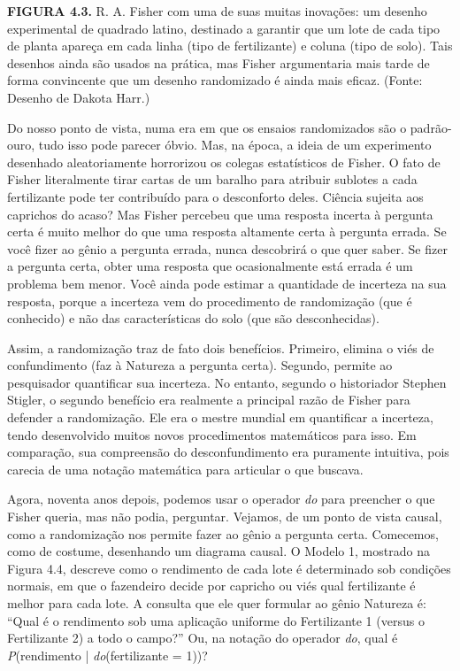 \documentclass[11pt,a5paper,twoside]{book}
\begin{document}
\textbf{FIGURA 4.3.} R. A. Fisher com uma de suas muitas inovações: um desenho experimental de quadrado latino, destinado a garantir que um lote de cada tipo de planta apareça em cada linha (tipo de fertilizante) e coluna (tipo de solo). Tais desenhos ainda são usados na prática, mas Fisher argumentaria mais tarde de forma convincente que um desenho randomizado é ainda mais eficaz. (Fonte: Desenho de Dakota Harr.)

Do nosso ponto de vista, numa era em que os ensaios randomizados são o padrão-ouro, tudo isso pode parecer óbvio. Mas, na época, a ideia de um experimento desenhado aleatoriamente horrorizou os colegas estatísticos de Fisher. O fato de Fisher literalmente tirar cartas de um baralho para atribuir sublotes a cada fertilizante pode ter contribuído para o desconforto deles. Ciência sujeita aos caprichos do acaso? Mas Fisher percebeu que uma resposta incerta à pergunta certa é muito melhor do que uma resposta altamente certa à pergunta errada. Se você fizer ao gênio a pergunta errada, nunca descobrirá o que quer saber. Se fizer a pergunta certa, obter uma resposta que ocasionalmente está errada é um problema bem menor. Você ainda pode estimar a quantidade de incerteza na sua resposta, porque a incerteza vem do procedimento de randomização (que é conhecido) e não das características do solo (que são desconhecidas).

Assim, a randomização traz de fato dois benefícios. Primeiro, elimina o viés de confundimento (faz à Natureza a pergunta certa). Segundo, permite ao pesquisador quantificar sua incerteza. No entanto, segundo o historiador Stephen Stigler, o segundo benefício era realmente a principal razão de Fisher para defender a randomização. Ele era o mestre mundial em quantificar a incerteza, tendo desenvolvido muitos novos procedimentos matemáticos para isso. Em comparação, sua compreensão do desconfundimento era puramente intuitiva, pois carecia de uma notação matemática para articular o que buscava.

Agora, noventa anos depois, podemos usar o operador \textit{do} para preencher o que Fisher queria, mas não podia, perguntar. Vejamos, de um ponto de vista causal, como a randomização nos permite fazer ao gênio a pergunta certa. Comecemos, como de costume, desenhando um diagrama causal. O Modelo 1, mostrado na Figura 4.4, descreve como o rendimento de cada lote é determinado sob condições normais, em que o fazendeiro decide por capricho ou viés qual fertilizante é melhor para cada lote. A consulta que ele quer formular ao gênio Natureza é: “Qual é o rendimento sob uma aplicação uniforme do Fertilizante 1 (versus o Fertilizante 2) a todo o campo?” Ou, na notação do operador \textit{do}, qual é \textit{P}(rendimento | \textit{do}(fertilizante = 1))?
\end{document}
